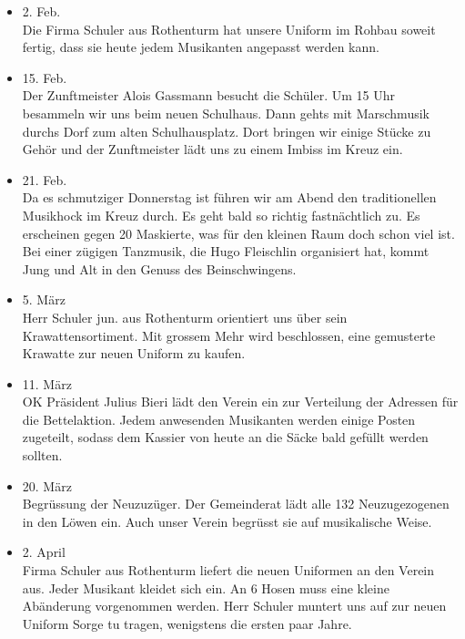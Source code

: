 \begin{multicols}{2}
\begin{itemize}
        \item[]2. Feb.\\
        Die Firma Schuler aus Rothenturm hat unsere Uniform im Rohbau soweit
        fertig, dass sie heute jedem Musikanten angepasst werden kann.

        \item[]15. Feb.\\
        Der Zunftmeister Alois Gassmann besucht die Schüler. Um 15 Uhr besammeln
        wir uns beim neuen Schulhaus. Dann gehts mit Marschmusik durchs Dorf zum
        alten Schulhausplatz. Dort bringen wir einige Stücke zu Gehör und der
        Zunftmeister lädt uns zu einem Imbiss im Kreuz ein.

        \item[]21. Feb.\\
        Da es schmutziger Donnerstag ist führen wir am Abend den traditionellen
        Musikhock im Kreuz durch. Es geht bald so richtig fastnächtlich zu. Es
        erscheinen gegen 20 Maskierte, was für den kleinen Raum doch schon viel
        ist. Bei einer zügigen Tanzmusik, die Hugo Fleischlin organisiert hat,
        kommt Jung und Alt in den Genuss des Beinschwingens.

        \item[]5. März\\
        Herr Schuler jun. aus Rothenturm orientiert uns über sein
        Krawattensortiment. Mit grossem Mehr wird beschlossen, eine gemusterte
        Krawatte zur neuen Uniform zu kaufen.

        \item[]11. März\\
        OK Präsident Julius Bieri lädt den Verein ein zur Verteilung der
        Adressen für die Bettelaktion. Jedem anwesenden Musikanten werden einige
        Posten zugeteilt, sodass dem Kassier von heute an die Säcke bald gefüllt
        werden sollten.

        \item[]20. März\\
        Begrüssung der Neuzuzüger. Der Gemeinderat lädt alle 132 Neuzugezogenen
        in den Löwen ein. Auch unser Verein begrüsst sie auf musikalische Weise.

        \item[]2. April\\
        Firma Schuler aus Rothenturm liefert die neuen Uniformen an den Verein
        aus. Jeder Musikant kleidet sich ein. An 6 Hosen muss eine kleine
        Abänderung vorgenommen werden. Herr Schuler muntert uns auf zur neuen
        Uniform Sorge tu tragen, wenigstens die ersten paar Jahre.


\end{itemize}
\end{multicols}
